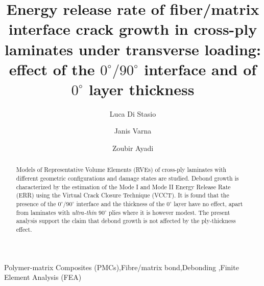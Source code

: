 \documentclass[review]{elsarticle}
\begin{document}
\begin{frontmatter}

\title{Energy release rate of fiber/matrix interface crack growth in cross-ply laminates under transverse loading: effect of the $0^{\circ}/90^{\circ}$ interface and of $0^{\circ}$ layer thickness}


\author[lulea,nancy]{Luca Di Stasio}
\author[lulea]{Janis Varna}
\author[nancy]{Zoubir Ayadi}


\address[lulea]{Lule\aa\ University of Technology, University Campus, SE-97187 Lule\aa, Sweden}
\address[nancy]{Universit\'e de Lorraine, EEIGM, IJL, 6 Rue Bastien Lepage, F-54010 Nancy, France}

\begin{abstract}
\noindent
Models of Representative Volume Elements (RVEs) of cross-ply laminates with different geometric configurations and damage states are studied. Debond growth is characterized by the estimation of the Mode I and Mode II Energy Release Rate (ERR) using the Virtual Crack Closure Technique (VCCT). It is found that the presence of the $0^{\circ}/90^{\circ}$ interface and the thickness of the $0^{\circ}$ layer have no effect, apart from laminates with \emph{ultra-thin} $90^{\circ}$ plies where it is however modest. The present analysis support the claim that debond growth is not affected by the ply-thickness effect.
\end{abstract}

\begin{keyword}
Polymer-matrix Composites (PMCs)\sep Fibre/matrix bond\sep Debonding \sep Finite Element Analysis (FEA)
\end{keyword}


\end{frontmatter}
\end{document}
